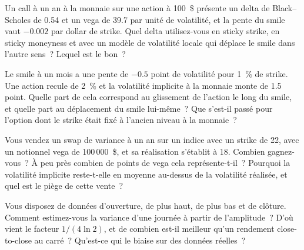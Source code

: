 \begin{question}\label{iq:iv2:vol-surface-and-vol-trading:13}
Un call à un an à la monnaie sur une action à 100~\$ présente un delta de Black--Scholes de 0.54 et un vega de 39.7 par unité de volatilité, et la pente du smile vaut $-0.002$ par dollar de strike. Quel delta utilisez-vous en sticky strike, en sticky moneyness et avec un modèle de volatilité locale qui déplace le smile dans l'autre sens~? Lequel est le bon~?
\end{question}

\begin{question}\label{iq:iv2:vol-surface-and-vol-trading:14}
Le smile à un mois a une pente de $-0.5$ point de volatilité pour 1~\% de strike. Une action recule de 2~\% et la volatilité implicite à la monnaie monte de 1.5 point. Quelle part de cela correspond au glissement de l'action le long du smile, et quelle part au déplacement du smile lui-même~? Que s'est-il passé pour l'option dont le strike était fixé à l'ancien niveau à la monnaie~?
\end{question}

\begin{question}\label{iq:iv2:vol-surface-and-vol-trading:15}
Vous vendez un swap de variance à un an sur un indice avec un strike de 22, avec un notionnel vega de 100\,000~\$, et sa réalisation s'établit à 18. Combien gagnez-vous~? À peu près combien de points de vega cela représente-t-il~? Pourquoi la volatilité implicite reste-t-elle en moyenne au-dessus de la volatilité réalisée, et quel est le piège de cette vente~?
\end{question}

\begin{question}\label{iq:iv2:vol-surface-and-vol-trading:16}
Vous disposez de données d'ouverture, de plus haut, de plus bas et de clôture. Comment estimez-vous la variance d'une journée à partir de l'amplitude~? D'où vient le facteur $1/(4\ln 2)$, et de combien est-il meilleur qu'un rendement close-to-close au carré~? Qu'est-ce qui le biaise sur des données réelles~?
\end{question}

